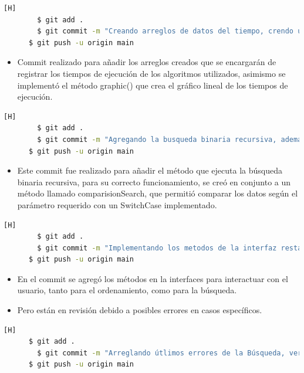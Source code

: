 \documentclass{article}
\begin{document}
    \begin{lstlisting}[language=bash,caption={Comit n°2}][H]		
		$ git add .
		$ git commit -m "Creando arreglos de datos del tiempo, crendo un metodo grafic que permite realizar una grafica lineal de los datos"
      $ git push -u origin main
	\end{lstlisting}

    \begin{itemize}
        \item Commit realizado para añadir los arreglos creados que se encargarán de registrar los tiempos de ejecución de los algoritmos utilizados, asimismo se implementó el método graphic() que crea el gráfico lineal de los tiempos de ejecución. 
    \end{itemize}

    \begin{lstlisting}[language=bash,caption={Comit n°3}][H]		
		$ git add .
		$ git commit -m "Agregando la busqueda binaria recursiva, ademas del metodo comparisionSearch que sera utilizado en la busqueda"
      $ git push -u origin main
	\end{lstlisting}

    \begin{itemize}
        \item Este commit fue realizado para añadir el método que ejecuta la búsqueda binaria recursiva, para su correcto funcionamiento, se creó en conjunto a un método llamado comparisionSearch, que permitió comparar los datos según el parámetro requerido con un SwitchCase implementado.
    \end{itemize}

     \begin{lstlisting}[language=bash,caption={Comit n°4}][H]		
		$ git add .
		$ git commit -m "Implementando los metodos de la interfaz restantes, aunque aun seguiran en revision por posibles errores u omisiones"
      $ git push -u origin main
	\end{lstlisting}

    \begin{itemize}
            \item En el commit se agregó los métodos en la interfaces para interactuar con el usuario, tanto para el ordenamiento, como para la búsqueda.
            \item Pero están en revisión debido a posibles errores en casos específicos.
    \end{itemize}

    \begin{lstlisting}[language=bash,caption={Comit n°5}][H]
      $ git add .
		$ git commit -m "Arreglando útlimos errores de la Búsqueda, versión final"
      $ git push -u origin main
	\end{lstlisting}
\end{document}
